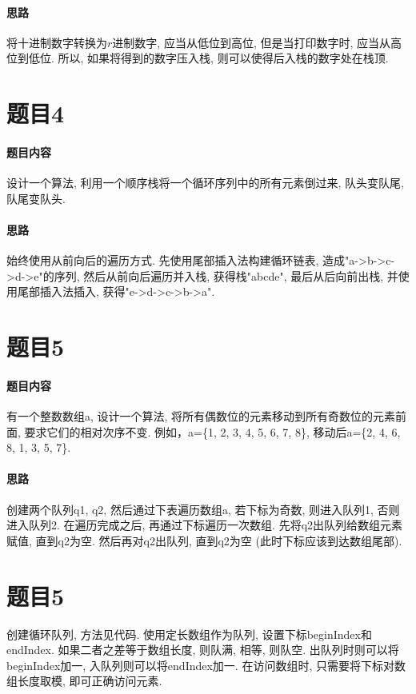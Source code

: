 \documentclass[a4paper]{article}
\begin{document}
\paragraph*{思路} 将十进制数字转换为$r$进制数字, 应当从低位到高位, 但是当打印数字时, 应当从高位到低位. 所以, 如果将得到的数字压入栈, 则可以使得后入栈的数字处在栈顶.



\section*{题目4}

\paragraph*{题目内容} 设计一个算法, 利用一个顺序栈将一个循环序列中的所有元素倒过来, 队头变队尾, 队尾变队头.

\paragraph*{思路}
始终使用从前向后的遍历方式. 先使用尾部插入法构建循环链表, 造成"a->b->c->d->e"的序列, 然后从前向后遍历并入栈,
获得栈"abcde", 最后从后向前出栈, 并使用尾部插入法插入, 获得"e->d->c->b->a".



\section*{题目5}

\paragraph*{题目内容}
有一个整数数组a, 设计一个算法,
将所有偶数位的元素移动到所有奇数位的元素前面, 要求它们的相对次序不变. 例如，a=\{1, 2, 3, 4, 5, 6, 7, 8\},
移动后a=\{2, 4, 6, 8, 1, 3, 5, 7\}.

\paragraph*{思路}
创建两个队列q1, q2, 然后通过下表遍历数组a, 若下标为奇数, 则进入队列1, 否则进入队列2.
在遍历完成之后, 再通过下标遍历一次数组. 先将q2出队列给数组元素赋值, 直到q2为空.
然后再对q2出队列, 直到q2为空 (此时下标应该到达数组尾部).



\section*{题目5}

创建循环队列, 方法见代码. 使用定长数组作为队列, 设置下标beginIndex和endIndex.
如果二者之差等于数组长度, 则队满, 相等, 则队空.
出队列时则可以将beginIndex加一, 入队列则可以将endIndex加一.
在访问数组时, 只需要将下标对数组长度取模, 即可正确访问元素.


\end{document}
